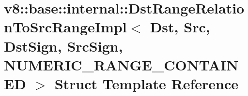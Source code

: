 \hypertarget{structv8_1_1base_1_1internal_1_1_dst_range_relation_to_src_range_impl_3_01_dst_00_01_01_01_01_01ab2f39c7ea8dfb0ed9715e7bb61ddec3}{}\section{v8\+:\+:base\+:\+:internal\+:\+:Dst\+Range\+Relation\+To\+Src\+Range\+Impl$<$ Dst, Src, Dst\+Sign, Src\+Sign, N\+U\+M\+E\+R\+I\+C\+\_\+\+R\+A\+N\+G\+E\+\_\+\+C\+O\+N\+T\+A\+I\+N\+ED $>$ Struct Template Reference}
\label{structv8_1_1base_1_1internal_1_1_dst_range_relation_to_src_range_impl_3_01_dst_00_01_01_01_01_01ab2f39c7ea8dfb0ed9715e7bb61ddec3}

